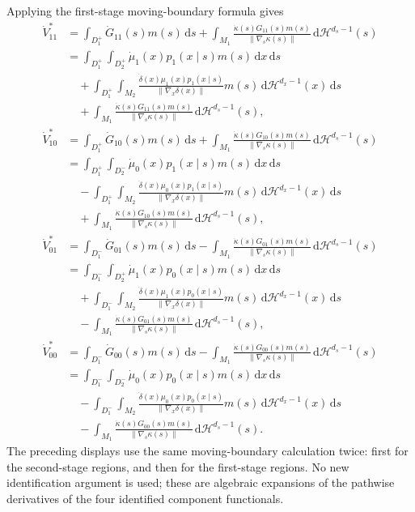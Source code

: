 \documentclass[12pt]{article}
\newcommand{\1}{\mathbf{1}}
\begin{document}
Applying the first-stage moving-boundary formula gives
\begin{align*}
\dot V_{11}^*
&=
\int_{D_1^+}\dot G_{11}(s)m(s)\,\mathrm ds
+
\int_{M_1}
\frac{\dot\kappa(s)G_{11}(s)m(s)}
{\lVert\nabla_s\kappa(s)\rVert}
\,\mathrm d\mathcal H^{d_s-1}(s) \\
&=
\int_{D_1^+}\int_{D_2^+}
\dot\mu_1(x)p_1(x\mid s)m(s)\,\mathrm dx\,\mathrm ds \\
&\quad+
\int_{D_1^+}\int_{M_2}
\frac{\dot\delta(x)\mu_1(x)p_1(x\mid s)}
{\lVert\nabla_x\delta(x)\rVert}
m(s)\,\mathrm d\mathcal H^{d_x-1}(x)\,\mathrm ds \\
&\quad+
\int_{M_1}
\frac{\dot\kappa(s)G_{11}(s)m(s)}
{\lVert\nabla_s\kappa(s)\rVert}
\,\mathrm d\mathcal H^{d_s-1}(s), \\
\dot V_{10}^*
&=
\int_{D_1^+}\dot G_{10}(s)m(s)\,\mathrm ds
+
\int_{M_1}
\frac{\dot\kappa(s)G_{10}(s)m(s)}
{\lVert\nabla_s\kappa(s)\rVert}
\,\mathrm d\mathcal H^{d_s-1}(s) \\
&=
\int_{D_1^+}\int_{D_2^-}
\dot\mu_0(x)p_1(x\mid s)m(s)\,\mathrm dx\,\mathrm ds \\
&\quad-
\int_{D_1^+}\int_{M_2}
\frac{\dot\delta(x)\mu_0(x)p_1(x\mid s)}
{\lVert\nabla_x\delta(x)\rVert}
m(s)\,\mathrm d\mathcal H^{d_x-1}(x)\,\mathrm ds \\
&\quad+
\int_{M_1}
\frac{\dot\kappa(s)G_{10}(s)m(s)}
{\lVert\nabla_s\kappa(s)\rVert}
\,\mathrm d\mathcal H^{d_s-1}(s), \\
\dot V_{01}^*
&=
\int_{D_1^-}\dot G_{01}(s)m(s)\,\mathrm ds
-
\int_{M_1}
\frac{\dot\kappa(s)G_{01}(s)m(s)}
{\lVert\nabla_s\kappa(s)\rVert}
\,\mathrm d\mathcal H^{d_s-1}(s) \\
&=
\int_{D_1^-}\int_{D_2^+}
\dot\mu_1(x)p_0(x\mid s)m(s)\,\mathrm dx\,\mathrm ds \\
&\quad+
\int_{D_1^-}\int_{M_2}
\frac{\dot\delta(x)\mu_1(x)p_0(x\mid s)}
{\lVert\nabla_x\delta(x)\rVert}
m(s)\,\mathrm d\mathcal H^{d_x-1}(x)\,\mathrm ds \\
&\quad-
\int_{M_1}
\frac{\dot\kappa(s)G_{01}(s)m(s)}
{\lVert\nabla_s\kappa(s)\rVert}
\,\mathrm d\mathcal H^{d_s-1}(s), \\
\dot V_{00}^*
&=
\int_{D_1^-}\dot G_{00}(s)m(s)\,\mathrm ds
-
\int_{M_1}
\frac{\dot\kappa(s)G_{00}(s)m(s)}
{\lVert\nabla_s\kappa(s)\rVert}
\,\mathrm d\mathcal H^{d_s-1}(s) \\
&=
\int_{D_1^-}\int_{D_2^-}
\dot\mu_0(x)p_0(x\mid s)m(s)\,\mathrm dx\,\mathrm ds \\
&\quad-
\int_{D_1^-}\int_{M_2}
\frac{\dot\delta(x)\mu_0(x)p_0(x\mid s)}
{\lVert\nabla_x\delta(x)\rVert}
m(s)\,\mathrm d\mathcal H^{d_x-1}(x)\,\mathrm ds \\
&\quad-
\int_{M_1}
\frac{\dot\kappa(s)G_{00}(s)m(s)}
{\lVert\nabla_s\kappa(s)\rVert}
\,\mathrm d\mathcal H^{d_s-1}(s).
\end{align*}
The preceding displays use the same moving-boundary calculation twice: first
for the second-stage regions, and then for the first-stage regions. No new
identification argument is used; these are algebraic expansions of the
pathwise derivatives of the four identified component functionals.
\end{document}
